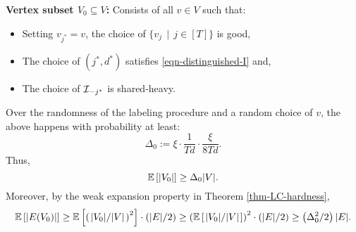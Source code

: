 \medskip
\noindent
{\bf Vertex subset $V_0 \subseteq V$:} Consists of all $v \in V$ such
that:
\begin{itemize}
\item Setting $v_{j^*} = v$, the choice of $\{v_j \,\mid\, j \in
[T]\}$ is good,
\item The choice of $(j^*, d^*)$ satisfies
\eqref{eqn-distinguished-I} and,
\item The choice of $\mathcal{I}_{-j^*}$ is shared-heavy.
\end{itemize}
Over the randomness of the labeling procedure and a random choice of
$v$, the above happens with probability at least:
\begin{equation}\label{eqn-Delta0}
\Delta_0 := \xi\cdot\frac{1}{Td}\cdot\frac{\xi}{8Td}.
\end{equation}
Thus, $$\mathbb{E}\left[|V_0|\right] \geq \Delta_0|V|.$$ 
Moreover, by the weak
expansion property in Theorem \ref{thm-LC-hardness},
\begin{equation}\label{eqn-E0}
\mathbb{E}\left[|E(V_0)|\right] \geq 
\mathbb{E}\left[\left(\left.|V_0|\middle/|V|\right.\right)^2\right]\cdot (|E|/2)
 \geq   \left(\mathbb{E}\left[\left.|V_0|\middle/|V|\right.\right]\right)^2\cdot
(|E|/2) 
 \geq  \left(\Delta_0^2/2\right)|E|.
\end{equation}

